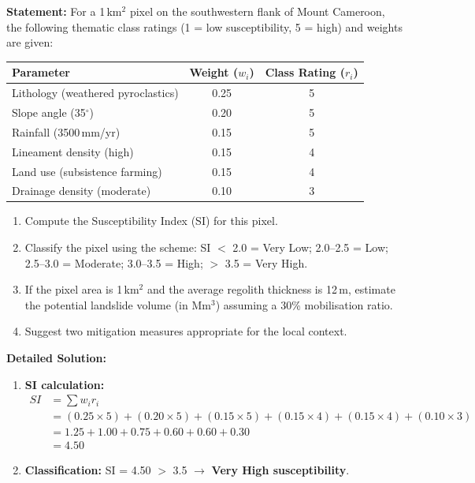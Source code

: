 \documentclass[11pt]{article}
\begin{document}
\begin{exoresolu}
\textbf{Statement:} For a 1\,km$^2$ pixel on the southwestern flank of Mount Cameroon, the following thematic class ratings (1 = low susceptibility, 5 = high) and weights are given:
\begin{center}
\begin{tabular}{|l|c|c|}\hline
Parameter & Weight ($w_i$) & Class Rating ($r_i$)\\\hline
Lithology (weathered pyroclastics) & 0.25 & 5\\\hline
Slope angle (35$^\circ$) & 0.20 & 5\\\hline
Rainfall (3500\,mm/yr) & 0.15 & 5\\\hline
Lineament density (high) & 0.15 & 4\\\hline
Land use (subsistence farming) & 0.15 & 4\\\hline
Drainage density (moderate) & 0.10 & 3\\\hline
\end{tabular}
\end{center}
\begin{enumerate}
\item Compute the Susceptibility Index (SI) for this pixel.
\item Classify the pixel using the scheme: SI $<$ 2.0 = Very Low; 2.0–2.5 = Low; 2.5–3.0 = Moderate; 3.0–3.5 = High; $>$ 3.5 = Very High.
\item If the pixel area is 1\,km$^2$ and the average regolith thickness is 12\,m, estimate the potential landslide volume (in Mm$^3$) assuming a 30\% mobilisation ratio.
\item Suggest two mitigation measures appropriate for the local context.
\end{enumerate}
\tcblower
\textbf{Detailed Solution:}
\begin{enumerate}
\item \textbf{SI calculation:}
\begin{align*}
SI &= \sum w_i r_i \\
&= (0.25 \times 5) + (0.20 \times 5) + (0.15 \times 5) + (0.15 \times 4) + (0.15 \times 4) + (0.10 \times 3)\\
&= 1.25 + 1.00 + 0.75 + 0.60 + 0.60 + 0.30\\
&= \mathbf{4.50}
\end{align*}
\item \textbf{Classification:} SI = 4.50 $>$ 3.5 $\rightarrow$ \textbf{Very High susceptibility}.

\end{enumerate}
\end{exoresolu}
\end{document}
